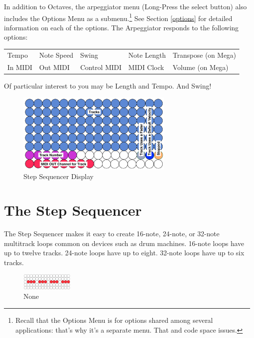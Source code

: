 \documentclass{article}
\begin{document}
In addition to Octaves, the arpeggiator menu (Long-Press the select button) also includes the Options Menu as a submenu.\footnote{Recall that the Options Menu is for options shared among several applications: that's why it's a separate menu.  That and code space issues.}  See Section \ref{options} for detailed information on each of the options.  The Arpeggiator responds to the following options:

\vspace{1em}
\begin{tabular}{lllll}
Tempo& Note Speed& Swing & Note Length&Transpose (on Mega)\\
In MIDI& Out MIDI&Control MIDI&MIDI Clock&Volume (on Mega)\\
\end{tabular}

\vspace{1em}
Of particular interest to you may be Length and Tempo.  And Swing!

\begin{figure}
\vspace{-4em}\includegraphics[width=3in]{stepsequencer}
\vspace{-2em}\caption{\small Step Sequencer Display}\vspace{-1em}
\label{stepsequencer}
\end{figure}

\section {The Step Sequencer}

The Step Sequencer makes it easy to create 16-note, 24-note, or 32-note multitrack loops common on devices such as drum machines.  16-note loops have up to twelve tracks.  24-note loops have up to eight.  32-note loops have up to six tracks.

\begin{figure}
\vspace{-1.5em}\includegraphics[width=1in]{none.pdf}
\vspace{-2em}\caption{\small None}\vspace{-2em}
\label{none}
\end{figure}
\end{document}
